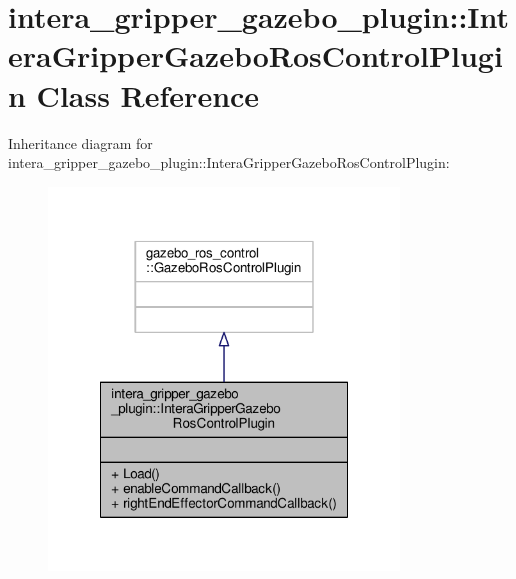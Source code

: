 \hypertarget{classintera__gripper__gazebo__plugin_1_1_intera_gripper_gazebo_ros_control_plugin}{\section{intera\-\_\-gripper\-\_\-gazebo\-\_\-plugin\-:\-:Intera\-Gripper\-Gazebo\-Ros\-Control\-Plugin Class Reference}
\label{classintera__gripper__gazebo__plugin_1_1_intera_gripper_gazebo_ros_control_plugin}
}


Inheritance diagram for intera\-\_\-gripper\-\_\-gazebo\-\_\-plugin\-:\-:Intera\-Gripper\-Gazebo\-Ros\-Control\-Plugin\-:
\nopagebreak
\begin{figure}[H]
\begin{center}
\leavevmode
\includegraphics[width=264pt]{classintera__gripper__gazebo__plugin_1_1_intera_gripper_gazebo_ros_control_plugin__inherit__graph}
\end{center}
\end{figure}


